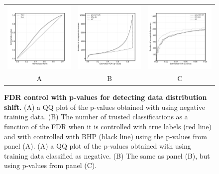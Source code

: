 \documentclass{article}
\begin{document}
\begin{figure}
    \centering
        \begin{tabular}{ccc}
 		\includegraphics[width=2in]{img/cnn_QQ_shift_binary_with.png} &
		\includegraphics[width=2in]{img/cnn_shift_test_pred_with_labels.png} & 
            \includegraphics[width=2in]
            {img/cnn_shift_test_pred_with_labels_loc.png}
		\\	
		A & B & C
	\end{tabular}
	\caption{{\bf  FDR control with p-values for detecting data distribution shift.}
		(A) a QQ plot of the p-values obtained with using negative training data. (B) The number of trusted classifications as a function of the FDR when it is controlled with true labels (red line) and with controlled with BHP (black line) using the p-values from panel (A).
		(A) a QQ plot of the p-values obtained with using training data classified as negative. (B) The same as panel (B), but using p-values from panel (C).
	}
	\label{fig:examplesssss}
\end{figure}
\end{document}
